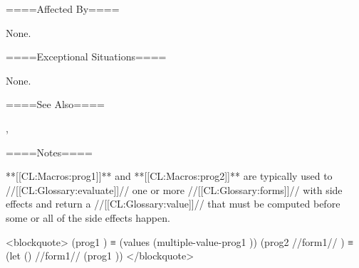 ====Affected By====

None.

====Exceptional Situations====

None.

====See Also====

, 

====Notes====

**[[CL:Macros:prog1]]** and **[[CL:Macros:prog2]]** are typically used to //[[CL:Glossary:evaluate]]// one or more //[[CL:Glossary:forms]]// with side effects and return a //[[CL:Glossary:value]]// that must be computed before some or all of the side effects happen.

<blockquote> (prog1 ) ≡ (values (multiple-value-prog1 )) (prog2 //form1// ) ≡ (let () //form1// (prog1 )) </blockquote>


